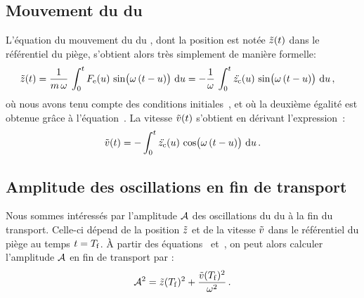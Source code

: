 \casse


\subsection{Mouvement du \cdm du \n}
L'équation du mouvement du \cdm du \n, dont la position est notée ${{\tilde{z}}(t)}$ dans le référentiel du piège, s'obtient alors très simplement de manière formelle:
\begin{align}
	\zpt &= \frac{1}{m\,\PulsUh} \, 
	\IntegraleBornes{\Fe(u) \, \sin\bigl(\PulsUh\,(t-u)\bigr)}
	{\ddint u}{0}{t}
	= 	-\frac{1}{\PulsUh} \, \IntegraleBornes{\ddzc(u) \, \sin\bigl(\PulsUh\,(t-u)\bigr)}
	{\ddint u}{0}{t}
	\virguleformule
	\label{eq:MouvZp}
\end{align}
où nous avons tenu compte des conditions initiales~, et où la deuxième égalité est obtenue grâce à l'équation~. 
La vitesse ${{\tilde{v}}(t)}$ s'obtient en dérivant l'expression~:
\begin{equation}
	\vpt %
	= 	- \IntegraleBornes{\ddzc(u) \, \cos\bigl(\PulsUh\,(t-u)\bigr)}
	{\ddint u}{0}{t}
	\pointformule
	\label{eq:MouvVp}
\end{equation}



\subsection{Amplitude des oscillations en fin de transport}\label{sec:AmplFinTransport}

Nous sommes intéressés par l'amplitude ${\mathcal{A}}$ des oscillations du \cdm du \n à la fin du transport. Celle-ci dépend de la position ${\tilde{z}}$ et de la vitesse ${\tilde{v}}$ dans le référentiel du piège au temps $t={T_{\rm f}}$. 
\`A partir des équations~ et~, on peut alors calculer l'amplitude ${\mathcal{A}}$ en fin de transport par :
\begin{equation}
	\Aosc^2 = \zp(\tfin)^2 + \dfrac{\vp(\tfin)^2}{\PulsUh^2}
	\pointformule
	\label{eq:AoscZpVp}
\end{equation}


